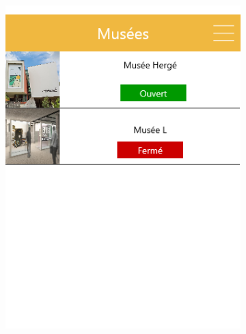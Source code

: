 \documentclass{eplmastersthesis}
\begin{document}
\begin{figure}[H]
    \centering
\begin{subfigure}[b]{0.3\textwidth}
        \includegraphics[width=\textwidth]{Images/InVision/liste-musees.png}
    \end{subfigure}
    ~ %
    \begin{subfigure}[b]{0.3\textwidth}

\end{subfigure}
\end{figure}
\end{document}
